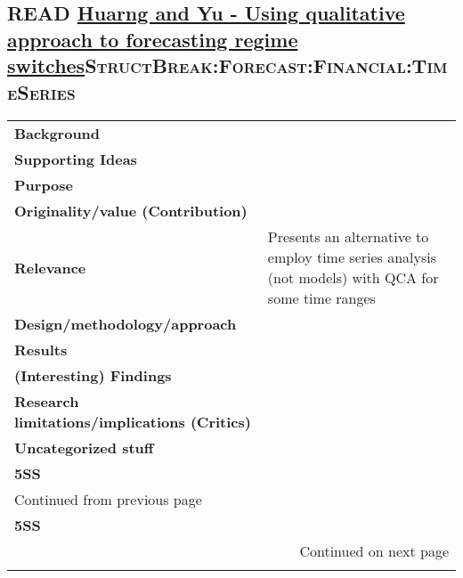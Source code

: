 \documentclass[11pt]{article}
\begin{document}
\subsection*{{\bfseries\sffamily READ} \href{https://doi.org/10.1007/s11135-016-0338-x}{Huarng and Yu -  Using qualitative approach to forecasting regime switches}\hfill{}\textsc{StructBreak:Forecast:Financial:TimeSeries}}
\label{sec:org0085aa0}
\begin{longtable}{l|p{}}
\hline
\hline
\textbf{Background} & \\
\textbf{Supporting Ideas} & \\
\textbf{Purpose} & \\
\textbf{Originality/value (Contribution)} & \\
\textbf{Relevance} & Presents an alternative to employ time series analysis (not models) with QCA for some time ranges\\
\textbf{Design/methodology/approach} & \\
\textbf{Results} & \\
\textbf{(Interesting) Findings} & \\
\textbf{Research limitations/implications (Critics)} & \\
\textbf{Uncategorized stuff} & \\
\textbf{5SS} & \\
\hline
\endfirsthead
\multicolumn{2}{l}{Continued from previous page} \\

\textbf{5SS} &  \\

\hline
\endhead
\hline\multicolumn{2}{r}{Continued on next page} \\
\endfoot
\endlastfoot
\hline
\hline
\end{longtable}
\end{document}
